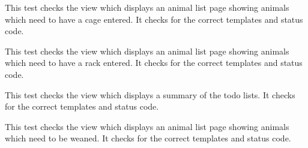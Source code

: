 \documentclass[letterpaper,10pt,english]{sphinxmanual}
\begin{document}
\begin{fulllineitems}
\begin{fulllineitems}
\end{fulllineitems}



\begin{fulllineitems}
\label{api:mousedb.animal.tests.ToDoViewTests.test_no_cage_list}
This test checks the view which displays an animal list page showing animals which need to have a cage entered.  It checks for the correct templates and status code.

\end{fulllineitems}



\begin{fulllineitems}
\label{api:mousedb.animal.tests.ToDoViewTests.test_no_rack_list}
This test checks the view which displays an animal list page showing animals which need to have a rack entered.  It checks for the correct templates and status code.

\end{fulllineitems}



\begin{fulllineitems}
\label{api:mousedb.animal.tests.ToDoViewTests.test_todo_home}
This test checks the view which displays a summary of the todo lists.  It checks for the correct templates and status code.

\end{fulllineitems}



\begin{fulllineitems}
\label{api:mousedb.animal.tests.ToDoViewTests.test_wean_list}
This test checks the view which displays an animal list page showing animals which need to be weaned.  It checks for the correct templates and status code.

\end{fulllineitems}


\end{fulllineitems}
\end{document}
